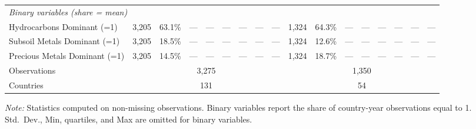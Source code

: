 \begin{table}[htbp]
\begin{tabular}{lrrrrrrrrrrrrrrrr}
\midrule
\multicolumn{17}{l}{\textit{Binary variables (share = mean)}} \\[2pt]
Hydrocarbons Dominant (=1) & 3,205 & 63.1\% & --- & --- & --- & --- & --- & --- & 1,324 & 64.3\% & --- & --- & --- & --- & --- & --- \\
Subsoil Metals Dominant (=1) & 3,205 & 18.5\% & --- & --- & --- & --- & --- & --- & 1,324 & 12.6\% & --- & --- & --- & --- & --- & --- \\
Precious Metals Dominant (=1) & 3,205 & 14.5\% & --- & --- & --- & --- & --- & --- & 1,324 & 18.7\% & --- & --- & --- & --- & --- & --- \\
\midrule
Observations & \multicolumn{8}{c}{3,275} & \multicolumn{8}{c}{1,350} \\
Countries    & \multicolumn{8}{c}{131} & \multicolumn{8}{c}{54} \\
\bottomrule
\end{tabular}
\begin{minipage}{\textwidth}\vspace{4pt}\footnotesize\textit{Note:} Statistics computed on non-missing observations. Binary variables report the share of country-year observations equal to 1. Std.\ Dev., Min, quartiles, and Max are omitted for binary variables.\end{minipage}
\end{table}